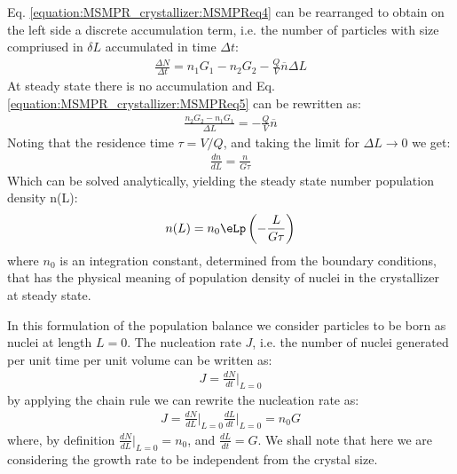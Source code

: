 \documentclass[letterpaper,10pt,english]{jupyterBook}
\begin{document}
\sphinxAtStartPar
Eq. \eqref{equation:MSMPR_crystallizer:MSMPReq4} can be rearranged to obtain on the left side a discrete accumulation term, i.e. the number of particles with size compriused in \(\delta{L}\) accumulated in time \(\Delta{t}\):
\begin{equation}\label{equation:MSMPR_crystallizer:MSMPReq5}
\begin{split}
\frac{\Delta{N}}{\Delta{t}}=n_1G_1-n_2G_2-\frac{Q}{V}\overline{n}\Delta{L}
\end{split}
\end{equation}
\sphinxAtStartPar
At steady state there is no accumulation and Eq. \eqref{equation:MSMPR_crystallizer:MSMPReq5} can be rewritten as:
\begin{equation}\label{equation:MSMPR_crystallizer:MSMPReq6}
\begin{split}
\frac{n_2G_2-n_1G_1}{\Delta{L}}=-\frac{Q}{V}\overline{n}
\end{split}
\end{equation}
\sphinxAtStartPar
Noting that the residence time \(\tau=V/Q\), and taking the limit for \(\Delta{L}\rightarrow{0}\) we get:
\begin{equation}\label{equation:MSMPR_crystallizer:MSMPReq7}
\begin{split}
\frac{dn}{dL}=\frac{n}{G\tau}
\end{split}
\end{equation}
\sphinxAtStartPar
Which can be solved analytically, yielding the steady state number population density n(L):
\begin{equation}\label{equation:MSMPR_crystallizer:MSMPReq8}
\begin{split}
n(L)=n_0\eLp\left(-\frac{L}{G\tau}\right)
\end{split}
\end{equation}
\sphinxAtStartPar
where \(n_0\) is an integration constant, determined from the boundary conditions, that has the physical meaning of population density of nuclei in the crystallizer at steady state.

\sphinxAtStartPar
In this formulation of the population balance we consider particles to be born as nuclei at length \(L=0\).
The nucleation rate \(J\), i.e. the number of nuclei generated per unit time per unit volume can be written as:
\begin{equation}\label{equation:MSMPR_crystallizer:MSMPReq9}
\begin{split}
J={\frac{dN}{dt}}\vert_{L=0}
\end{split}
\end{equation}
\sphinxAtStartPar
by applying the chain rule we can rewrite the nucleation rate as:
\begin{equation}\label{equation:MSMPR_crystallizer:MSMPReq10}
\begin{split}
J=\frac{dN}{dL}\vert_{L=0}\frac{dL}{dt}\vert_{L=0}=n_0G
\end{split}
\end{equation}
\sphinxAtStartPar
where, by definition \(\frac{dN}{dL}\vert_{L=0}=n_0\), and \(\frac{dL}{dt}=G\). We shall note that here we are considering the growth rate to be independent from the crystal size.
\end{document}
